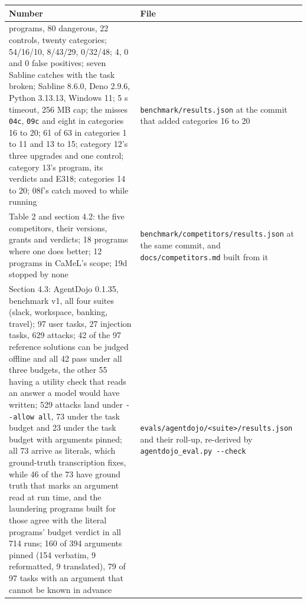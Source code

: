 \documentclass[
]{article}
\newcounter{none} %
\begin{document}
{\def\LTcaptype{none} %
\begin{longtable}[]{@{}
  >{\raggedright\arraybackslash}p{}
  >{\raggedright\arraybackslash}p{}@{}}
\toprule\noalign{}
\begin{minipage}[b]{\linewidth}\raggedright
Number
\end{minipage} & \begin{minipage}[b]{\linewidth}\raggedright
File
\end{minipage} \\
\midrule\noalign{}
\endhead
\bottomrule\noalign{}
\endlastfoot
102 programs, 80 dangerous, 22 controls, twenty categories; 54/16/10,
8/43/29, 0/32/48; 4, 0 and 0 false positives; seven Sabline catches with
the task broken; Sabline 8.6.0, Deno 2.9.6, Python 3.13.13, Windows 11;
5 s timeout, 256 MB cap; the misses \texttt{04c}, \texttt{09c} and eight
in categories 16 to 20; 61 of 63 in categories 1 to 11 and 13 to 15;
category 12's three upgrades and one control; category 13's program, its
verdicts and E318; categories 14 to 20; 08f's catch moved to while
running & \texttt{benchmark/results.json} at the commit that added
categories 16 to 20 \\
Table 2 and section 4.2: the five competitors, their versions, grants
and verdicts; 18 programs where one does better; 12 programs in CaMeL's
scope; 19d stopped by none & \texttt{benchmark/competitors/results.json}
at the same commit, and \texttt{docs/competitors.md} built from it \\
Section 4.3: AgentDojo 0.1.35, benchmark v1, all four suites (slack,
workspace, banking, travel); 97 user tasks, 27 injection tasks, 629
attacks; 42 of the 97 reference solutions can be judged offline and all
42 pass under all three budgets, the other 55 having a utility check
that reads an answer a model would have written; 529 attacks land under
\texttt{-\/-allow\ all}, 73 under the task budget and 23 under the task
budget with arguments pinned; all 73 arrive as literals, which
ground-truth transcription fixes, while 46 of the 73 have ground truth
that marks an argument read at run time, and the laundering programs
built for those agree with the literal programs' budget verdict in all
714 runs; 160 of 394 arguments pinned (154 verbatim, 9 reformatted, 9
translated), 79 of 97 tasks with an argument that cannot be known in
advance &
\texttt{evals/agentdojo/\textless{}suite\textgreater{}/results.json} and
their roll-up, re-derived by \texttt{agentdojo\_eval.py\ -\/-check} \\

\end{longtable}}
\end{document}
